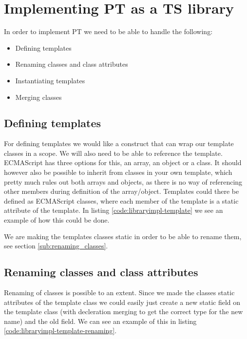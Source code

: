 \section{Implementing PT as a TS library}%
\label{sec:implementing_pt_as_a_ts_library}

In order to implement PT we need to be able to handle the following:

\begin{itemize}
    \item Defining templates
    \item Renaming classes and class attributes
    \item Instantiating templates
    \item Merging classes
\end{itemize}

\subsection{Defining templates}%
\label{sub:defining_templates}

For defining templates we would like a construct that can wrap our template classes in a scope.
We will also need to be able to reference the template.
ECMAScript has three options for this, an array, an object or a class.
It should however also be possible to inherit from classes in your own template, which pretty much rules out both arrays and objects, as there is no way of referencing other members during definition of the array/object.
Templates could there be defined as ECMAScript classes, where each member of the template is a static attribute of the template. 
In listing \vref{code:libraryimpl-template} we see an example of how this could be done.

We are making the templates classes static in order to be able to rename them, see section \vref{sub:renaming_classes}.


\subsection{Renaming classes and class attributes}%
\label{sub:renaming_classes}

Renaming of classes is possible to an extent.
Since we made the classes static attributes of the template class we could easily just create a new static field on the template class (with decleration merging to get the correct type for the new name) and \cite{deleteop} the old field. 
We can see an example of this in listing \vref{code:libraryimpl-template-renaming}.

